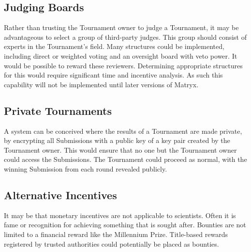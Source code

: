 \documentclass[a4paper, 10pt, conference]{ieeeconf}      %
\begin{document}
\subsection{Judging Boards} \label{judgingboards}
Rather than trusting the Tournament owner to judge a Tournament, it may be advantageous to select a group of third-party judges.
This group should consist of experts in the Tournament’s field. 
Many structures could be implemented, including direct or weighted voting and an oversight board with veto power. 
It would be possible to reward these reviewers. 
Determining appropriate structures for this would require significant time and incentive analysis.
As such this capability will not be implemented until later versions of Matryx.

\subsection{Private Tournaments}\label{privateTournaments}
A system can be conceived where the results of a Tournament are made private, by encrypting all Submissions with a public key of a key pair created by the Tournament owner. 
This would ensure that no one but the Tournament owner could access the Submissions. 
The Tournament could proceed as normal, with the winning Submission from each round revealed publicly.

\subsection{Alternative Incentives}\label{alternative incentives}
It may be that monetary incentives are not applicable to scientists. 
Often it is fame or recognition for achieving something that is sought after. 
Bounties are not limited to a financial reward like the Millennium Prize. 
Title-based rewards registered by trusted authorities could potentially be placed as bounties.

\printbibliography
\end{document}
